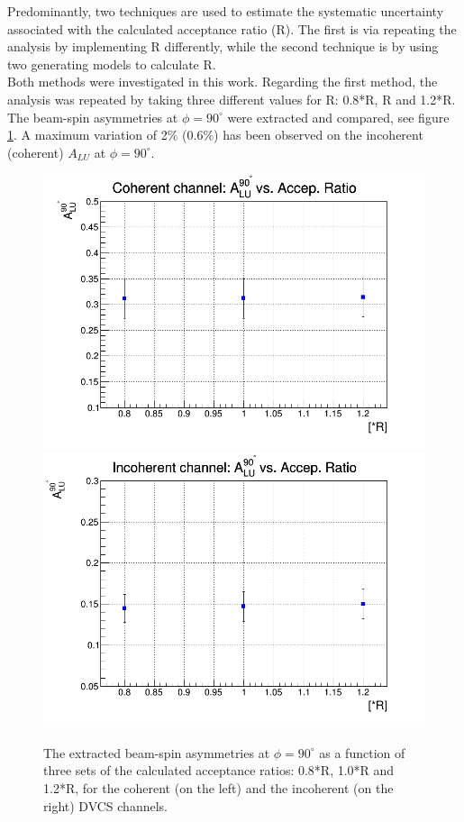 Predominantly, two techniques are used to estimate the systematic uncertainty 
associated with the calculated acceptance ratio (R). The first is via repeating 
the analysis by implementing R differently, while the second technique is by 
using two generating models to calculate R.\\

Both methods were investigated in this work. Regarding the first method, the 
analysis was repeated by taking three different values for R: 0.8*R, R and 
1.2*R. The beam-spin asymmetries at $\phi = 90^{\circ}$ were extracted and 
compared, see figure \ref{fig:background_sub_sys_uncer}. A maximum variation of 
2$\%$ (0.6$\%$) has been observed on the incoherent (coherent) $A_{LU}$ at 
$\phi = 90^{\circ}$. \\

\begin{figure}[tp]
\includegraphics[scale=0.30]{fig_dvcs/final_coh_BSA_NR.png}
\includegraphics[scale=0.30]{fig_dvcs/final_incoh_BSA_NR.png}
\caption{The extracted beam-spin asymmetries at $\phi = 90^{\circ}$ as a 
function of three sets of the calculated acceptance ratios: 0.8*R, 1.0*R and 
1.2*R, for the coherent (on the left) and the incoherent (on the right) DVCS 
channels.} \label{fig:background_sub_sys_uncer}
\end{figure}

